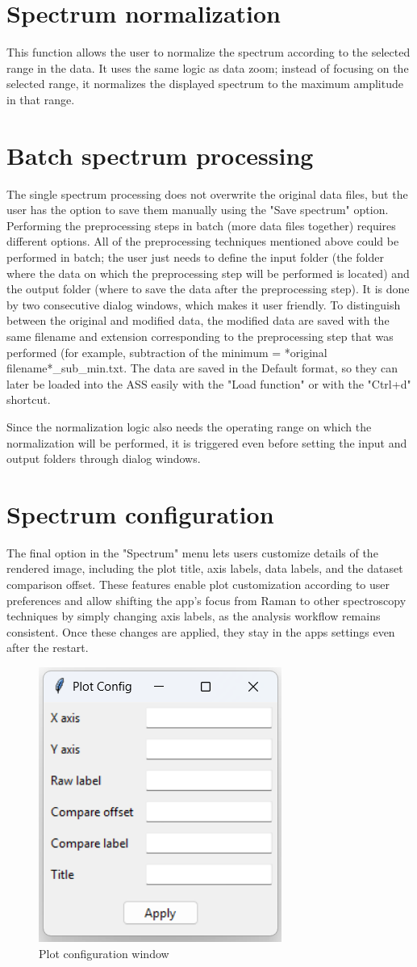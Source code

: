 \section{Spectrum normalization}

This function allows the user to normalize the spectrum according to the selected range in the data. It uses the same logic as data zoom; instead of focusing on the selected range, it normalizes the displayed spectrum to the maximum amplitude in that range.

\section{Batch spectrum processing}

The single spectrum processing does not overwrite the original data files, but the user has the option to save them manually using the "Save spectrum" option. Performing the preprocessing steps in batch (more data files together) requires different options. All of the preprocessing techniques mentioned above could be performed in batch; the user just needs to define the input folder (the folder where the data on which the preprocessing step will be performed is located) and the output folder (where to save the data after the preprocessing step). It is done by two consecutive dialog windows, which makes it user friendly. To distinguish between the original and modified data, the modified data are saved with the same filename and extension corresponding to the preprocessing step that was performed (for example, subtraction of the minimum = *original filename*\_sub\_min.txt. The data are saved in the Default format, so they can later be loaded into the ASS easily with the "Load function" or with the "Ctrl+d" shortcut.

Since the normalization logic also needs the operating range on which the normalization will be performed, it is triggered even before setting the input and output folders through dialog windows.

\section{Spectrum configuration}
The final option in the "Spectrum" menu lets users customize details of the rendered image, including the plot title, axis labels, data labels, and the dataset comparison offset. These features enable plot customization according to user preferences and allow shifting the app's focus from Raman to other spectroscopy techniques by simply changing axis labels, as the analysis workflow remains consistent. Once these changes are applied, they stay in the apps settings even after the restart.

\begin{figure}[H]
    \centering
    \includegraphics[width=0.4\linewidth]{Resources/plot_config.png}
    \caption{Plot configuration window}
    \label{plot_config}
\end{figure}